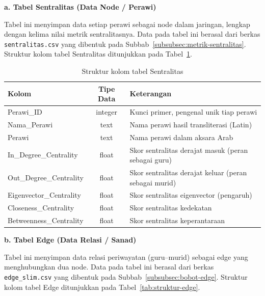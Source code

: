 \noindent\textbf{a. Tabel Sentralitas (Data Node / Perawi)}

\begin{sloppypar}
Tabel ini menyimpan data setiap perawi sebagai node dalam jaringan, lengkap dengan kelima nilai metrik sentralitasnya. Data pada tabel ini berasal dari berkas \texttt{sentralitas.csv} yang dibentuk pada Subbab~\ref{subsubsec:metrik-sentralitas}. Struktur kolom tabel Sentralitas ditunjukkan pada Tabel~\ref{tab:struktur-sentralitas}.
\end{sloppypar}

\begin{table}[H]
\centering
\caption{Struktur kolom tabel Sentralitas}
\label{tab:struktur-sentralitas}
\renewcommand{\arraystretch}{1.3}
\begin{tabular}{|l|c|p{6.5cm}|}
\hline
\textbf{Kolom} & \textbf{Tipe Data} & \textbf{Keterangan} \\
\hline
Perawi\_ID & integer & Kunci primer, pengenal unik tiap perawi \\
\hline
Nama\_Perawi & text & Nama perawi hasil transliterasi (Latin) \\
\hline
Perawi & text & Nama perawi dalam aksara Arab \\
\hline
In\_Degree\_Centrality & float & Skor sentralitas derajat masuk (peran sebagai guru) \\
\hline
Out\_Degree\_Centrality & float & Skor sentralitas derajat keluar (peran sebagai murid) \\
\hline
Eigenvector\_Centrality & float & Skor sentralitas eigenvector (pengaruh) \\
\hline
Closeness\_Centrality & float & Skor sentralitas kedekatan \\
\hline
Betweenness\_Centrality & float & Skor sentralitas keperantaraan \\
\hline
\end{tabular}
\end{table}

\noindent\textbf{b. Tabel Edge (Data Relasi / Sanad)}

\begin{sloppypar}
Tabel ini menyimpan data relasi periwayatan (guru--murid) sebagai edge yang menghubungkan dua node. Data pada tabel ini berasal dari berkas \texttt{edge\_slim.csv} yang dibentuk pada Subbab~\ref{subsubsec:bobot-edge}. Struktur kolom tabel Edge ditunjukkan pada Tabel~\ref{tab:struktur-edge}.
\end{sloppypar}

